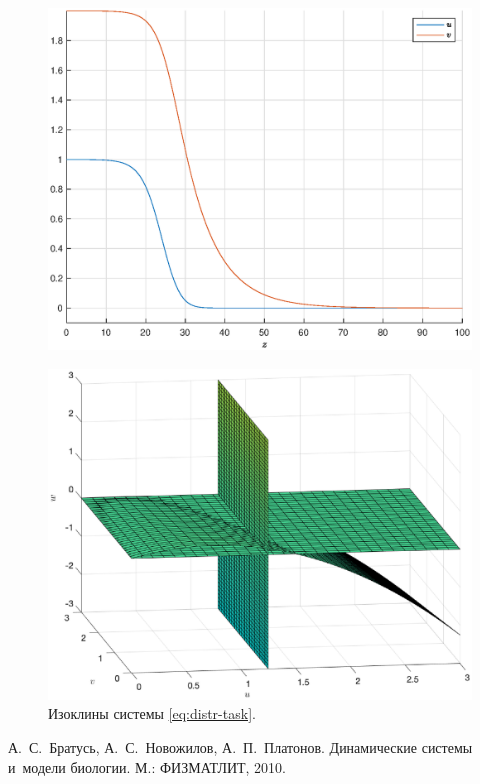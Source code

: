\documentclass[a4paper, 11pt]{article}
\begin{document}
		\begin{figure}[t]
			\centering
			\includegraphics[width=0.7\linewidth]{p3p1-uv.eps}
		\end{figure}
		\begin{figure}[t]
			\centering
			\includegraphics[width=0.7\linewidth]{izo.eps}
			\caption{Изоклины системы \eqref{eq:distr-task}.}
		\end{figure}
	\clearpage
	\begin{thebibliography}{9}
                 А.~С.~Братусь, А.~С.~Новожилов, А.~П.~Платонов. Динамические системы и~модели биологии. М.: ФИЗМАТЛИТ, 2010.
    \end{thebibliography} 
\end{document}
